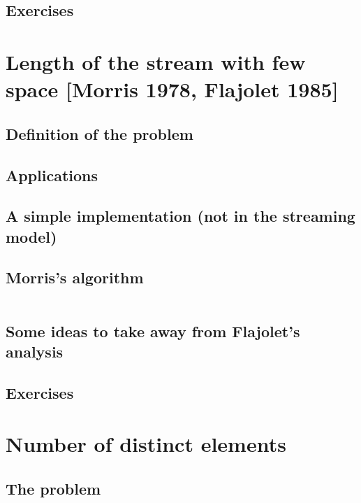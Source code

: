 \documentclass[11pt]{article}
\begin{document}
\subsection{Exercises}



\section{Length of the stream with few space {\small [Morris 1978, Flajolet 1985]}}

\subsection{Definition of the problem}

\subsection{Applications}

\subsection{A simple implementation (not in the streaming model)}

\subsection{Morris's algorithm} $\,$

\subsection{Some ideas to take away from Flajolet's analysis}

\subsection{Exercises}


\section{Number of distinct elements}

\subsection{The problem}
\end{document}
